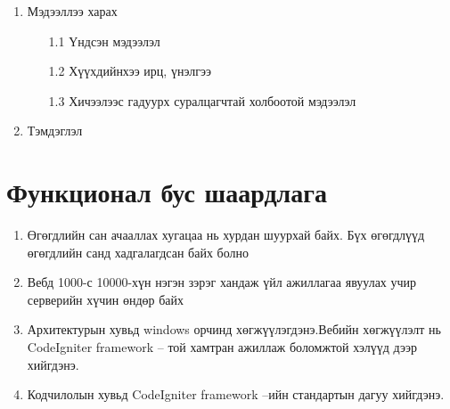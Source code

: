 \begin{enumerate}
	\item Мэдээллээ харах
	\begin{enumerate}
		\item[1.1] Үндсэн мэдээлэл
		\item[1.2] Хүүхдийнхээ ирц, үнэлгээ
		\item[1.3] Хичээлээс гадуурх суралцагчтай холбоотой мэдээлэл
	\end{enumerate}
	\item Тэмдэглэл
\end{enumerate}
\section{Функционал бус шаардлага}
\begin{enumerate}
	\item Өгөгдлийн сан ачааллах хугацаа нь хурдан шуурхай байх. Бүх өгөгдлүүд өгөгдлийн санд хадгалагдсан байх болно
	\item Вебд 1000-с 10000-хүн нэгэн зэрэг хандаж үйл ажиллагаа явуулах учир серверийн хүчин өндөр байх
	\item Архитектурын хувьд windows орчинд хөгжүүлэгдэнэ.Вебийн хөгжүүлэлт нь CodeIgniter framework – той хамтран ажиллаж боломжтой хэлүүд дээр хийгдэнэ.
	\item Кодчилолын хувьд CodeIgniter framework –ийн стандартын дагуу хийгдэнэ.
\end{enumerate}
